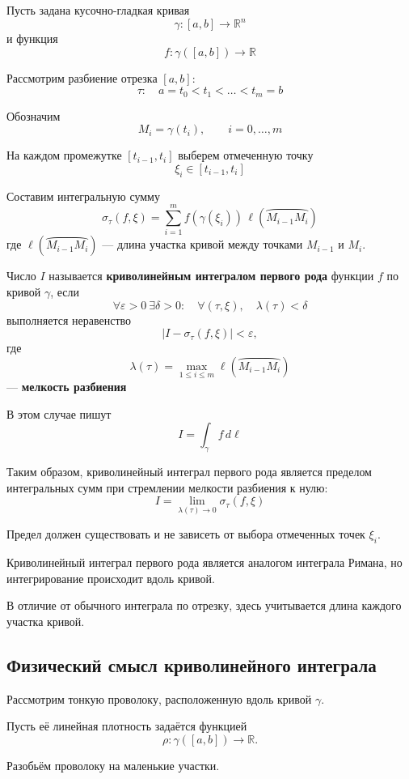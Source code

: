 \documentclass[12pt,a4paper]{article}
\begin{document}
Пусть задана кусочно-гладкая кривая
\[
\gamma:[a,b]\to\mathbb{R}^n
\]
и функция
\[
f:\gamma([a,b])\to\mathbb{R}
\]

Рассмотрим разбиение отрезка $[a,b]$:
\[
\tau:\quad a=t_0<t_1<\dots<t_m=b
\]

Обозначим
\[
M_i=\gamma(t_i),\qquad i=0,\dots,m
\]

На каждом промежутке $[t_{i-1},t_i]$ выберем отмеченную точку
\[
\xi_i\in[t_{i-1},t_i]
\]

Составим интегральную сумму
\[
\sigma_\tau(f,\xi)
=
\sum_{i=1}^{m}
f(\gamma(\xi_i))\,
\ell(\wideparen{M_{i-1}M_i})
\]
где $\ell(\wideparen{M_{i-1}M_i})$ — длина участка кривой между точками $M_{i-1}$ и $M_i$.

\begin{definition}
Число $I$ называется \textbf{криволинейным интегралом первого рода} функции $f$ по кривой $\gamma$, если
\[
\forall\varepsilon>0\ \exists\delta>0:
\quad
\forall(\tau,\xi),\quad
\lambda(\tau)<\delta
\]
выполняется неравенство
\[
|I-\sigma_\tau(f,\xi)|<\varepsilon,
\]
где
\[
\lambda(\tau)
=
\max_{1\leq i\leq m}
\ell(\wideparen{M_{i-1}M_i})
\]
— \textbf{мелкость разбиения}

В этом случае пишут
\[
I=\int_\gamma f\,d\ell
\]
\end{definition}

Таким образом, криволинейный интеграл первого рода является пределом интегральных сумм при стремлении мелкости разбиения к нулю:
\[
\boxed{
I=\lim_{\lambda(\tau)\to0}
\sigma_\tau(f,\xi)
}
\]

Предел должен существовать и не зависеть от выбора отмеченных точек $\xi_i$.

\begin{note}
Криволинейный интеграл первого рода является аналогом интеграла Римана, но интегрирование происходит вдоль кривой.

В отличие от обычного интеграла по отрезку, здесь учитывается длина каждого участка кривой.
\end{note}

\subsection{Физический смысл криволинейного интеграла}

Рассмотрим тонкую проволоку, расположенную вдоль кривой $\gamma$.

Пусть её линейная плотность задаётся функцией
\[
\rho:\gamma([a,b])\to\mathbb{R}.
\]

Разобьём проволоку на маленькие участки.
\end{document}
